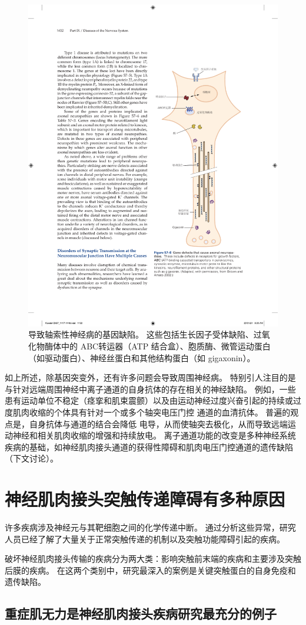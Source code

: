 \begin{figure}[htbp]
	\centering
	\includegraphics[width=0.5\linewidth]{chap57/fig_57_6}
	\caption{导致轴索性神经病的基因缺陷。
		这些包括生长因子受体缺陷、过氧化物酶体中的 ABC转运器（ATP 结合盒）、胞质酶、微管运动蛋白（如驱动蛋白）、神经丝蛋白和其他结构蛋白（如 gigaxonin）\cite{brown2002inherited}。}
	\label{fig:57_6}
\end{figure}


如上所述，除基因突变外，还有许多问题会导致周围神经病。
特别引人注目的是与针对远端周围神经中离子通道的自身抗体的存在相关的神经缺陷。
例如，一些患有运动单位不稳定（痉挛和肌束震颤）以及由运动神经过度兴奋引起的持续或过度肌肉收缩的个体具有针对一个或多个轴突电压门控  通道的血清抗体。
普遍的观点是，自身抗体与通道的结合会降低  电导，从而使轴突去极化，从而导致远端运动神经和相关肌肉收缩的增强和持续放电。
离子通道功能的改变是多种神经系统疾病的基础，如神经肌肉接头通道的获得性障碍和肌肉电压门控通道的遗传缺陷（下文讨论）。



\section{神经肌肉接头突触传递障碍有多种原因}

许多疾病涉及神经元与其靶细胞之间的化学传递中断。
通过分析这些异常，研究人员已经了解了大量关于正常突触传递的机制以及突触功能障碍引起的疾病。


破坏神经肌肉接头传输的疾病分为两大类：影响突触前末端的疾病和主要涉及突触后膜的疾病。
在这两个类别中，研究最深入的案例是关键突触蛋白的自身免疫和遗传缺陷。



\subsection{重症肌无力是神经肌肉接头疾病研究最充分的例子}

